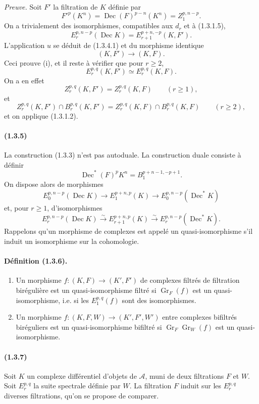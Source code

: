 \documentclass[10pt]{article}
\newcommand{\Gr}{\operatorname{Gr}}
\newcommand{\calA}{\mathcal A}
\newcommand{\iso}{\xrightarrow{\sim}}
\newcommand{\Dec}{\operatorname{Dec}}
\begin{document}
\emph{Preuve.} Soit $F'$ la filtration de $K$ définie par
\[
F'^p(K^n)=\Dec(F)^{p-n}(K^n)=Z_1^{p,n-p}.
\]
On a trivialement des isomorphismes, compatibles aux $d_r$ et à (1.3.1.5),
\[
\tag{1.3.4.1}
E_r^{p,n-p}(\Dec K)=E_{r+1}^{p+n,-p}(K,F').
\]
L'application $u$ se déduit de (1.3.4.1) et du morphisme identique
\[
(K,F')\longrightarrow(K,F).
\]
Ceci prouve (i), et il reste à vérifier que pour $r\ge2$,
\[
E_r^{p,q}(K,F')\simeq E_r^{p,q}(K,F).
\]
On a en effet
\[
Z_r^{p,q}(K,F')=Z_r^{p,q}(K,F)\qquad(r\ge1),
\]
et
\[
Z_r^{p,q}(K,F')\cap B_r^{p,q}(K,F')=Z_r^{p,q}(K,F)\cap B_r^{p,q}(K,F)\qquad(r\ge2),
\]
et on applique (1.3.1.2).

\paragraph{(1.3.5)} La construction (1.3.3) n'est pas autoduale. La construction duale consiste à définir
\[
\Dec^*(F)^pK^n=B_1^{p+n-1,-p+1}.
\]
On dispose alors de morphismes
\[
E_0^{p,n-p}(\Dec K)\longrightarrow E_1^{p+n,p}(K)\longrightarrow E_0^{p,n-p}(\Dec^*K)
\]
et, pour $r\ge1$, d'isomorphismes
\[
E_r^{p,n-p}(\Dec K)\iso E_{r+1}^{p+n,p}(K)\iso E_r^{p,n-p}(\Dec^*K).
\]
Rappelons qu'un morphisme de complexes est appelé un quasi-isomorphisme s'il induit un isomorphisme sur la cohomologie.

\paragraph{Définition (1.3.6).}
\begin{enumerate}[label=(\roman*)]
\item Un morphisme $f:(K,F)\to(K',F')$ de complexes filtrés de filtration birégulière est un quasi-isomorphisme filtré si $\Gr_F(f)$ est un quasi-isomorphisme, i.e. si les $E_1^{p,q}(f)$ sont des isomorphismes.
\item Un morphisme $f:(K,F,W)\to(K',F',W')$ entre complexes bifiltrés biréguliers est un quasi-isomorphisme bifiltré si $\Gr_F\Gr_W(f)$ est un quasi-isomorphisme.
\end{enumerate}

\paragraph{(1.3.7)} Soit $K$ un complexe différentiel d'objets de $\calA$, muni de deux filtrations $F$ et $W$. Soit $E_r^{p,q}$ la suite spectrale définie par $W$. La filtration $F$ induit sur les $E_r^{p,q}$ diverses filtrations, qu'on se propose de comparer.
\end{document}
